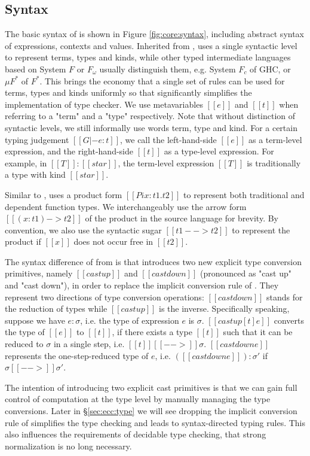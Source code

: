 \subsection{Syntax}\label{sec:core:syn}
The basic syntax of \name is shown in Figure \ref{fig:core:syntax}, including abstract syntax of expressions, contexts and values. Inherited from \cc, \name uses a single syntactic level to represent terms, types and kinds, while other typed intermediate languages based on System $F$ or $F_\omega$ usually distinguish them, e.g. System $F_c$ of GHC, or $\mu F^*$ of $F^*$. This brings the economy that a single set of rules can be used for terms, types and kinds uniformly so that significantly simplifies the implementation of type checker. We use metavariables $[[e]]$ and $[[t]]$ when referring to a "term" and a "type" respectively. Note that without distinction of syntactic levels, we still informally use words term, type and kind. For a certain typing judgement $[[G |- e:t]]$, we call the left-hand-side $[[e]]$ as a term-level expression, and the right-hand-side $[[t]]$ as a type-level expression. For example, in $[[T]] : [[star]]$, the term-level expression $[[T]]$ is traditionally a type with kind $[[star]]$.

Similar to \cc, \name uses a product form $[[Pi x:t1.t2]]$ to represent both traditional and dependent function types. We interchangeably use the arrow form $[[(x:t1)->t2]]$ of the product in the source language for brevity. By convention, we also use the syntactic sugar $[[t1 --> t2]]$ to represent the product if $[[x]]$ does not occur free in $[[t2]]$.

The syntax difference of from \cc is that \expcc introduces two new explicit type conversion primitives, namely $[[castup]]$ and $[[castdown]]$ (pronounced as "cast up" and "cast down"), in order to replace the implicit conversion rule of \cc. They represent two directions of type conversion operations: $[[castdown]]$ stands for the reduction of types while $[[castup]]$ is the inverse. Specifically speaking, suppose we have $e:\sigma$, i.e. the type of expression $e$ is $\sigma$. $[[castup [t] e]]$ converts the type of $[[e]]$ to $[[t]]$, if there exists a type $[[t]]$ such that it can be reduced to $\sigma$ in a single step, i.e. $[[t]] [[-->]] \sigma$. $[[castdown e]]$ represents the one-step-reduced type of $e$, i.e. $([[castdown e]]) : \sigma'$ if $\sigma [[-->]] \sigma'$.

The intention of introducing two explicit cast primitives is that we can gain full control of computation at the type level by manually managing the type conversions. Later in \S \ref{sec:ecc:type} we will see dropping the implicit conversion rule of \cc simplifies the type checking and leads to syntax-directed typing rules. This also influences the requirements of decidable type checking, that strong normalization is no long necessary.

